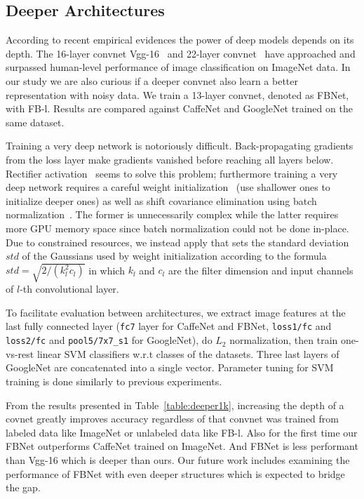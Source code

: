 \documentclass[preprint,12pt]{elsarticle}
\begin{document}
\subsection{Deeper Architectures}
\noindent According to recent empirical evidences the power of deep models depends on its depth. The 16-layer convnet Vgg-16~\cite{DBLP:journals/corr/SimonyanZ14a} and 22-layer convnet~\cite{DBLP:journals/corr/SzegedyLJSRAEVR14} have approached and surpassed human-level performance of image classification on ImageNet data. In our study we are also curious if a deeper convnet also learn a better representation with  noisy data. We train a 13-layer convnet, denoted as FBNet, with FB-l. Results are compared against CaffeNet and GoogleNet trained on the same dataset.

Training a very deep network is notoriously difficult. Back-propagating gradients from the loss layer make gradients vanished before reaching all layers below. Rectifier activation~\cite{DBLP:journals/jmlr/GlorotBB11} seems to solve this problem; furthermore training a very deep network requires a careful weight initialization~\cite{romero2014fitnets} (use shallower ones to initialize deeper ones) as well as shift covariance elimination using batch normalization~\cite{DBLP:conf/icml/IoffeS15}. The former is unnecessarily complex while the latter requires more GPU memory space since batch normalization could not be done in-place. Due to constrained resources, we instead apply \cite{he2015delving} that sets the standard deviation $std$ of the Gaussians used by weight initialization according to the formula $std=\sqrt{2/(k_l^2c_l)}$ in which $k_l$ and $c_l$ are the filter dimension and input channels of $l$-th convolutional layer.

To facilitate evaluation between architectures, we extract image features at the last fully connected layer (\texttt{fc7} layer for CaffeNet and FBNet, \texttt{loss1/fc} and \texttt{loss2/fc} and \texttt{pool5/7x7\_s1} for GoogleNet), do $L_2$ normalization, then train one-vs-rest linear SVM classifiers w.r.t classes of the datasets. Three last layers of GoogleNet are concatenated into a single vector. Parameter tuning for SVM training is done similarly to previous experiments. 

From the results presented in Table~\ref{table:deeper1k}, increasing the depth of a covnet greatly improves accuracy regardless of that convnet was trained from labeled data like  ImageNet or unlabeled data like FB-l. Also for the first time our FBNet outperforms CaffeNet trained on ImageNet. And FBNet is less performant than Vgg-16 which is deeper than ours. Our future work includes examining the performance of FBNet with even deeper structures which is expected to bridge the gap.
\end{document}
